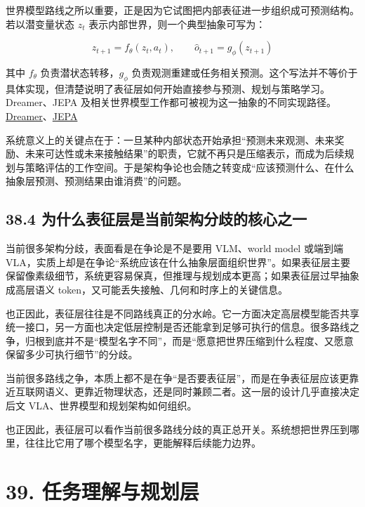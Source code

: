 世界模型路线之所以重要，正是因为它试图把内部表征进一步组织成可预测结构。若以潜变量状态 \(z_t\) 表示内部世界，则一个典型抽象可写为：

\begingroup
\footnotesize
\begin{equation*}
z_{t+1} = f_\theta(z_t, a_t), \qquad \hat{o}_{t+1} = g_\phi(z_{t+1})
\end{equation*}
\endgroup

其中 \(f_\theta\) 负责潜状态转移，\(g_\phi\) 负责观测重建或任务相关预测。这个写法并不等价于具体实现，但清楚说明了表征层如何开始直接参与预测、规划与策略学习。Dreamer、JEPA 及相关世界模型工作都可被视为这一抽象的不同实现路径。\href{https://arxiv.org/abs/1912.01603}{Dreamer}、\href{https://arxiv.org/abs/2301.08243}{JEPA}

系统意义上的关键点在于：一旦某种内部状态开始承担“预测未来观测、未来奖励、未来可达性或未来接触结果”的职责，它就不再只是压缩表示，而成为后续规划与策略评估的工作空间。于是架构争论也会随之转变成“应该预测什么、在什么抽象层预测、预测结果由谁消费”的问题。

\section*{38.4 为什么表征层是当前架构分歧的核心之一}


当前很多架构分歧，表面看是在争论是不是要用 VLM、world model 或端到端 VLA，实质上却是在争论“系统应该在什么抽象层面组织世界”。如果表征层主要保留像素级细节，系统更容易保真，但推理与规划成本更高；如果表征层过早抽象成高层语义 token，又可能丢失接触、几何和时序上的关键信息。

也正因此，表征层往往是不同路线真正的分水岭。它一方面决定高层模型能否共享统一接口，另一方面也决定低层控制是否还能拿到足够可执行的信息。很多路线之争，归根到底并不是“模型名字不同”，而是“愿意把世界压缩到什么程度、又愿意保留多少可执行细节”的分歧。

当前很多路线之争，本质上都不是在争“是否要表征层”，而是在争表征层应该更靠近互联网语义、更靠近物理状态，还是同时兼顾二者。这一层的设计几乎直接决定后文 VLA、世界模型和规划架构如何组织。

也正因此，表征层可以看作当前很多路线分歧的真正总开关。系统想把世界压到哪里，往往比它用了哪个模型名字，更能解释后续能力边界。

\chapter*{39. 任务理解与规划层}

